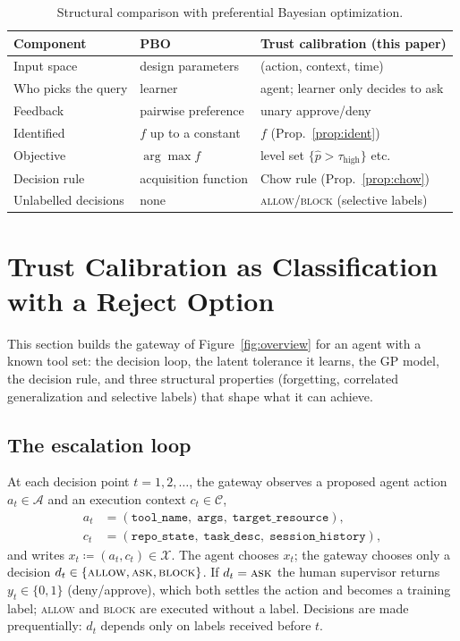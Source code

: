\documentclass[11pt]{article}
\begin{document}
\begin{table}[t]
\centering
\small
\begin{tabular}{@{}lll@{}}
\toprule
\textbf{Component} & \textbf{PBO} & \textbf{Trust calibration (this paper)} \\
\midrule
Input space & design parameters & (action, context, time) \\
Who picks the query & learner & agent; learner only decides to ask \\
Feedback & pairwise preference & unary approve/deny \\
Identified & $f$ up to a constant & $f$ (Prop.~\ref{prop:ident}) \\
Objective & $\arg\max f$ & level set $\{\hat p > \tau_{\text{high}}\}$ etc. \\
Decision rule & acquisition function & Chow rule (Prop.~\ref{prop:chow}) \\
Unlabelled decisions & none & \textsc{allow}/\textsc{block} (selective labels) \\
\bottomrule
\end{tabular}
\caption{Structural comparison with preferential Bayesian optimization.}
\label{tab:mapping}
\end{table}

\section{Trust Calibration as Classification with a Reject Option}\label{sec:method}

This section builds the gateway of Figure~\ref{fig:overview} for an agent
with a known tool set: the decision loop, the latent tolerance it learns, the
GP model, the decision rule, and three structural properties (forgetting,
correlated generalization and selective labels) that shape what it can
achieve.

\subsection{The escalation loop}\label{sec:loop}

At each decision point $t = 1, 2, \ldots$, the gateway observes a proposed
agent action $a_t \in \mathcal{A}$ and an execution context $c_t \in \mathcal{C}$,
%
\begin{align}
    a_t &= (\texttt{tool\_name},\; \texttt{args},\; \texttt{target\_resource}), \\
    c_t &= (\texttt{repo\_state},\; \texttt{task\_desc},\; \texttt{session\_history}),
\end{align}
%
and writes $x_t \coloneqq (a_t, c_t) \in \mathcal{X}$. The agent chooses $x_t$;
the gateway chooses only a decision $d_t \in \{\textsc{allow}, \textsc{ask},
\textsc{block}\}$. If $d_t = \textsc{ask}$ the human supervisor returns
$y_t \in \{0,1\}$ (deny/approve), which both settles the action and becomes a
training label; \textsc{allow} and \textsc{block} are executed without a label.
Decisions are made prequentially: $d_t$ depends only on labels received before
$t$.
\end{document}
